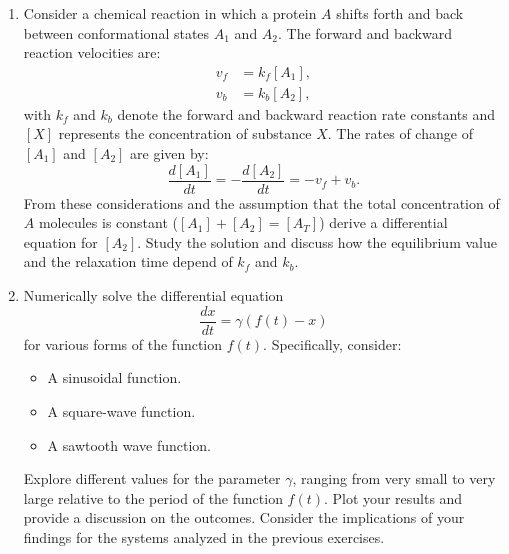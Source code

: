 \begin{enumerate}
    \item Consider a chemical reaction in which a protein $A$ shifts forth and back between conformational states $A_1$ and $A_2$. The forward and backward reaction velocities are:
    \begin{align*}
        v_f &= k_f [A_1], \\
        v_b &= k_b [A_2],
    \end{align*}
    with $k_f$ and $k_b$ denote the forward and backward reaction rate constants and $[X]$ represents the concentration of substance $X$. The rates of change of $[A_1]$ and $[A_2]$ are given by:
    \begin{equation*}
        \frac{d[A_1]}{dt} = - \frac{d[A_2]}{dt} = - v_f + v_b .
    \end{equation*}
    From these considerations and the assumption that the total concentration of $A$ molecules is constant ($[A_1] + [A_2] = [A_T]$) derive a differential equation for $[A_2]$. Study the solution and discuss how the equilibrium value and the relaxation time depend of $k_f$ and $k_b$.

    \item Numerically solve the differential equation
    \begin{equation*}
        \frac{dx}{dt} = \gamma (f(t) - x)
    \end{equation*}
    for various forms of the function $f(t)$. Specifically, consider:
    \begin{itemize}
        \item A sinusoidal function.
        \item A square-wave function.
        \item A sawtooth wave function.
    \end{itemize}
    Explore different values for the parameter $\gamma$, ranging from very small to very large relative to the period of the function $f(t)$. Plot your results and provide a discussion on the outcomes. Consider the implications of your findings for the systems analyzed in the previous exercises.
\end{enumerate}